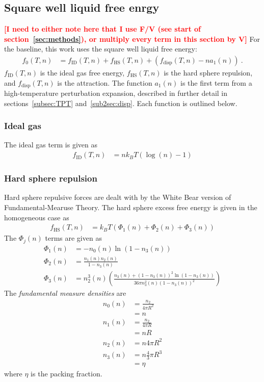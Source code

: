 \documentclass[letterpaper,twocolumn,amsmath,amssymb,prb]{revtex4-1}
\newcommand{\kT}{\ensuremath{k_BT}}
\newcommand{\fid}{\ensuremath{f_\text{ID}(T,n)}}
\newcommand{\fhs}{\ensuremath{f_\text{HS}(T,n)}}
\newcommand{\fdisp}{\ensuremath{f_\text{disp}(T,n)}}
\newcommand{\1}{\ensuremath{\textbf{r}_1}}
\newcommand{\2}{\ensuremath{\textbf{r}_2}}
\newcommand{\3}{\ensuremath{\textbf{r}_3}}
\newcommand{\4}{\ensuremath{\textbf{r}_4}}
\newcommand{\fixme}[1]{\textcolor{red}{\textbf{[#1]}}}
\begin{document}
\subsection{Square well liquid free enrgy}\label{subsec:SW}
\fixme{I need to either note here that I use F/V (see start of section~\ref{sec:methods}), or multiply every term in this section by V}
For the baseline, this work uses the square well liquid free energy:\cite{Hughes13}
\begin{align}
  f_0(T,n) &= \fid + \fhs + \left( \fdisp - n a_1(n) \right) \ .
\end{align}
$\fid$ is the ideal gas free energy, $\fhs$ is the hard sphere
repulsion, and $\fdisp$ is the attraction. The function $a_1(n)$ is
the first term from a high-temperature perturbation expansion,
described in further detail in sections~\ref{subsec:TPT}
and~\ref{sub2sec:disp}. Each function is outlined below.

\subsubsection{Ideal gas}\label{sub2sec:ID}
The ideal gas term is given as
\begin{align}
  \fid &= n\kT\left(\log(n) - 1\right)
\end{align}

\subsubsection{Hard sphere repulsion}\label{sub2sec:HS}
Hard sphere repulsive forces are dealt with by the White Bear version
of Fundamental-Mearuse Theory.\cite{Roth02} The hard sphere excess
free energy is given in the homogeneous case as
\begin{align}
  \fhs &= \kT\left( \Phi_1(n) + \Phi_2(n) + \Phi_3(n) \right)
\end{align}
The $\Phi_j(n)$ terms are given as
\begin{align}
  \Phi_1(n) &= -n_0(n)\ln(1 - n_3(n)) \\
  \Phi_2(n) &= \frac{n_1(n)n_2(n)}{1 - n_3(n)} \\
  \Phi_3(n) &= n_2^3(n)\left( \frac{n_3(n) + (1 - n_3(n))^2\ln(1 - n_3(n))}{36\pi n_3^2(n)(1 - n_3(n))^2} \right)
\end{align}
The \emph{fundamental measure densities} are
\begin{align}
  n_0(n) &= \frac{n_2}{4\pi R^2} \nonumber \\
  &= n \\
  n_1(n) &= \frac{n_2}{4\pi R} \nonumber \\
  &= nR \\
  n_2(n) &= n4\pi R^2 \\
  n_3(n) &= n\frac{4}{3}\pi R^3 \nonumber \\
  &= \eta \label{eqn:packingFrac}
\end{align}
where $\eta$ is the packing fraction.
\end{document}
